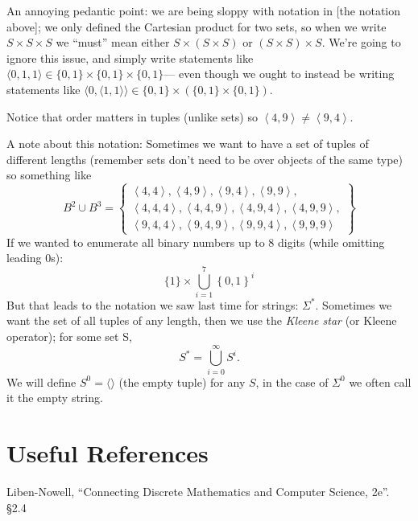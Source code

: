 \begin{tcolorbox}[colback=blue!5,colframe=blue!75!black,title=Quote from Liben-Newell \S2.4]
An annoying pedantic point: we are being sloppy with notation in [the notation above]; 
we only defined the Cartesian product for two sets, 
so when we write $S\times S\times S$ we “must” mean either $S\times (S\times S)$ or $(S\times S)\times S$. 
We’re going to ignore this issue, and simply write statements like $\langle 0, 1, 1\rangle \in \{0, 1\}\times \{0, 1\} \times \{0, 1\}$---%
even though we ought to instead be writing statements like $\langle 0, \langle1, 1\rangle\rangle \in \{0, 1\}\times (\{0, 1\} \times \{0, 1\})$.
\end{tcolorbox}
 
Notice that order matters in tuples (unlike sets) so $ \left\langle 4,9 \right\rangle \neq \left\langle 9,4 \right\rangle$.

A note about this notation:
Sometimes we want to have a set of tuples of different lengths (remember sets don't need to be over objects of the same type) 
so something like 
\[
B^2 \cup B^3 = \left\{  \begin{matrix}\left\langle 4,4 \right\rangle, \left\langle 4,9 \right\rangle,  \left\langle 9,4 \right\rangle, \left\langle 9,9 \right\rangle,\\
				\left\langle 4,4,4 \right\rangle, \left\langle 4,4,9 \right\rangle,  \left\langle 4,9,4 \right\rangle, \left\langle 4,9,9 \right\rangle,\\
				\left\langle 9,4,4 \right\rangle, \left\langle 9,4,9 \right\rangle,  \left\langle 9,9,4 \right\rangle, \left\langle 9,9,9 \right\rangle \end{matrix}\right\}
\]
If we wanted to enumerate all binary numbers up to 8 digits (while omitting leading 0s):
\[
\{1\} \times \bigcup_{i=1}^7 \left\{0,1\right\}^i
\]
But that leads to the notation we saw last time for strings: $\Sigma^*$.
Sometimes we want the set of all tuples of any length, then we use the \emph{Kleene star} (or Kleene operator); 
for some set S, 
\[
S^* =  \bigcup_{i=0}^\infty S^i.
\]
We will define $S^0 = \langle\rangle$ (the empty tuple) for any $S$, in the case of $\Sigma^0$ we often call it the empty string.

\section*{Useful References}
Liben-Nowell, ``Connecting Discrete Mathematics and Computer Science, 2e''. \S 2.4

